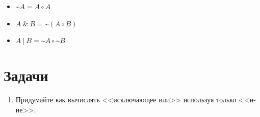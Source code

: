 \begin{itemize}
    \item $\mbox{\textasciitilde}A = A \circ A$
    \item $A\ \mbox{\&}\ B = \mbox{\textasciitilde}(A \circ B)$
    \item $A\ |\ B = \mbox{\textasciitilde}A \circ \mbox{\textasciitilde}B$
\end{itemize}


\section{Задачи}

\begin{enumerate}
    \item Придумайте как вычислять <<исключающее или>> используя только <<и-не>>.
\end{enumerate}

